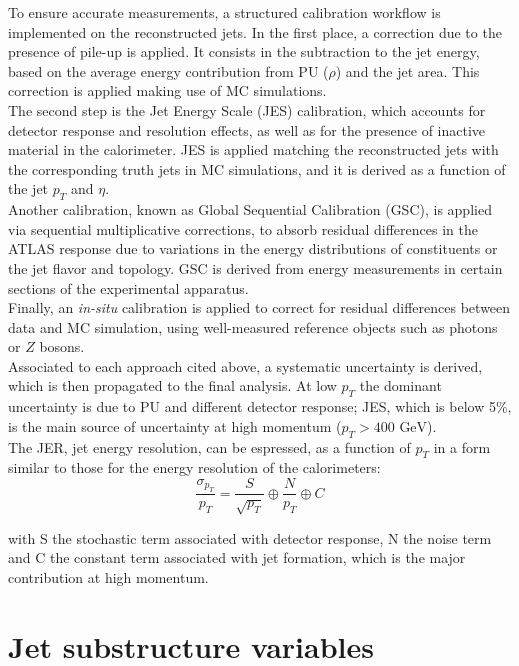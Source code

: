 To ensure accurate measurements, a structured calibration workflow is implemented on the reconstructed jets.
In the first place, a correction due to the presence of pile-up is applied. It consists in the subtraction to the jet energy, based on the average energy contribution from PU ($\rho$) and the jet area.
This correction is applied making use of MC simulations.\\
The second step is the Jet Energy Scale (JES) calibration, which accounts for detector response and resolution effects, as well as for the presence of inactive material in the calorimeter.
JES is applied matching the reconstructed jets with the corresponding truth jets in MC simulations, and it is derived as a function of the jet $p_T$ and $\eta$.\\
Another calibration, known as Global Sequential Calibration (GSC), is applied via sequential multiplicative corrections, to absorb residual differences in the ATLAS response due to variations in the energy distributions of constituents or the jet flavor and topology.
GSC is derived from energy measurements in certain sections of the experimental apparatus.\\
Finally, an \textit{in-situ} calibration is applied to correct for residual differences between data and MC simulation, using well-measured reference objects such as photons or $Z$ bosons.\\
Associated to each approach cited above, a systematic uncertainty is derived, which is then propagated to the final analysis.
At low $p_T$ the dominant uncertainty is due to PU and different detector response; JES, which is below 5\%, is the main source of uncertainty at high momentum ($p_T > 400\text{ GeV}$).\\
The JER, jet energy resolution, can be espressed, as a function of $p_T$ in a form similar to those for the energy resolution of the calorimeters:
\begin{equation}\label{eq:Reco/Jets/JCal/JER}
\frac{\sigma_{p_T}}{p_T} =  \frac{S}{\sqrt{p_T}} \oplus \frac{N}{p_T} \oplus C
\end{equation}

\noindent with S the stochastic term associated with detector response, N the noise term and C the constant term associated with jet formation, which is the major contribution at high momentum.

\section{Jet substructure variables}\label{sec:Reco/Vars}

